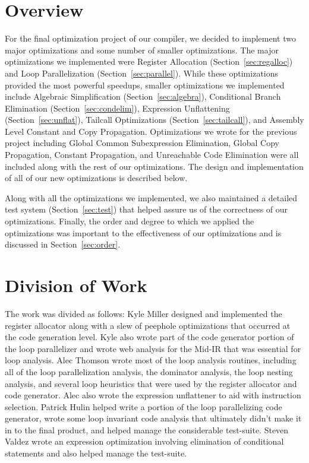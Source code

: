\documentclass[11pt]{article}
\begin{document}
\section {Overview}

For the final optimization project of our compiler, we decided to
implement two major optimizations and some number of smaller
optimizations. The major optimizations we implemented were Register
Allocation (Section~\ref{sec:regalloc}) and Loop Parallelization
(Section~\ref{sec:parallel}). While these optimizations provided the
most powerful speedups, smaller optimizations we implemented include
Algebraic Simplification (Section~\ref{sec:algebra}), Conditional
Branch Elimination (Section~\ref{sec:condelim}), Expression
Unflattening (Section~\ref{sec:unflat}), Tailcall
Optimizations (Section~\ref{sec:tailcall}), and Assembly Level
Constant and Copy Propagation. Optimizations we wrote for the previous
project including Global Common Subexpression Elimination, Global Copy
Propagation, Constant Propagation, and Unreachable Code Elimination
were all included along with the rest of our optimizations. The design
and implementation of all of our new optimizations is described
below. 

Along with all the optimizations we implemented, we also maintained a
detailed test system (Section~\ref{sec:test}) that helped assure us
of the correctness of our optimizations. Finally, the order and degree
to which we applied the optimizations was important to the
effectiveness of our optimizations and is discussed in Section~\ref{sec:order}.

\section {Division of Work}

The work was divided as follows: Kyle Miller designed and implemented
the register allocator along with a slew of peephole optimizations
that occurred at the code generation level. Kyle also wrote part of
the code generator portion of the loop parallelizer and wrote web
analysis for the Mid-IR that was essential for loop analysis. Alec Thomson wrote most of
the loop analysis routines, including all of the loop parallelization
analysis, the dominator analysis, the loop nesting analysis, and
several loop heuristics that were used by the register allocator and
code generator. Alec
also wrote the expression unflattener to aid with instruction
selection. Patrick Hulin helped write a portion of the loop
parallelizing code generator, wrote some loop invariant code analysis
that ultimately didn't make it in to the final product, and helped
manage the considerable test-suite. Steven Valdez wrote an expression
optimization involving elimination of conditional statements and also
helped manage the test-suite.
\end{document}
